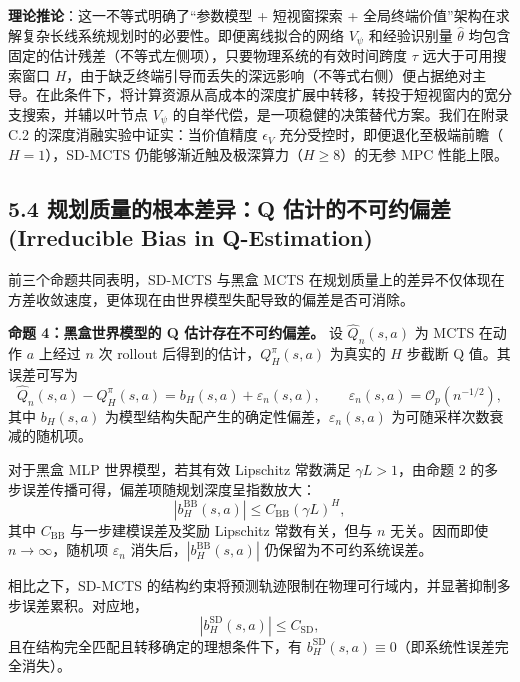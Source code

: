 \documentclass[UTF8]{ctexart}
\begin{document}
\textbf{理论推论}：这一不等式明确了``参数模型 + 短视窗探索 + 全局终端价值''架构在求解复杂长线系统规划时的必要性。即便离线拟合的网络 \(V_\psi\) 和经验识别量 \(\hat{\theta}\) 均包含固定的估计残差（不等式左侧项），只要物理系统的有效时间跨度 \(\tau\) 远大于可用搜索窗口 \(H\)，由于缺乏终端引导而丢失的深远影响（不等式右侧）便占据绝对主导。在此条件下，将计算资源从高成本的深度扩展中转移，转投于短视窗内的宽分支搜索，并辅以叶节点 $V_\psi$ 的自举代偿，是一项稳健的决策替代方案。我们在附录 C.2 的深度消融实验中证实：当价值精度 $\epsilon_V$ 充分受控时，即便退化至极端前瞻（$H=1$），SD-MCTS 仍能够渐近触及极深算力（$H \ge 8$）的无参 MPC 性能上限。

\hypertarget{ux89c4ux5212ux8d28ux91cfux7684ux6839ux672cux5deeux5f02q-ux4f30ux8ba1ux7684ux4e0dux53efux7ea6ux504fux5dee-irreducible-bias-in-q-estimation}{%
\subsection{5.4 规划质量的根本差异：Q 估计的不可约偏差 (Irreducible Bias
in
Q-Estimation)}\label{ux89c4ux5212ux8d28ux91cfux7684ux6839ux672cux5deeux5f02q-ux4f30ux8ba1ux7684ux4e0dux53efux7ea6ux504fux5dee-irreducible-bias-in-q-estimation}}

前三个命题共同表明，SD-MCTS 与黑盒 MCTS 在规划质量上的差异不仅体现在方差收敛速度，更体现在由世界模型失配导致的偏差是否可消除。

\textbf{命题 4：黑盒世界模型的 Q 估计存在不可约偏差。} 设 $\hat{Q}_{n}(s,a)$ 为 MCTS 在动作 $a$ 上经过 $n$ 次 rollout 后得到的估计，$Q_H^\pi(s,a)$ 为真实的 $H$ 步截断 Q 值。其误差可写为
\[
\hat{Q}_{n}(s,a)-Q_H^\pi(s,a)=b_H(s,a)+\varepsilon_n(s,a),\qquad \varepsilon_n(s,a)=\mathcal{O}_p(n^{-1/2}),
\]
其中 $b_H(s,a)$ 为模型结构失配产生的确定性偏差，$\varepsilon_n(s,a)$ 为可随采样次数衰减的随机项。

对于黑盒 MLP 世界模型，若其有效 Lipschitz 常数满足 $\gamma L>1$，由命题 2 的多步误差传播可得，偏差项随规划深度呈指数放大：
\[
\left|b_H^{\mathrm{BB}}(s,a)\right|\le C_{\mathrm{BB}}(\gamma L)^H,
\]
其中 $C_{\mathrm{BB}}$ 与一步建模误差及奖励 Lipschitz 常数有关，但与 $n$ 无关。因而即使 $n\to\infty$，随机项 $\varepsilon_n$ 消失后，$\left|b_H^{\mathrm{BB}}(s,a)\right|$ 仍保留为不可约系统误差。

相比之下，SD-MCTS 的结构约束将预测轨迹限制在物理可行域内，并显著抑制多步误差累积。对应地，
\[
\left|b_H^{\mathrm{SD}}(s,a)\right|\le C_{\mathrm{SD}},
\]
且在结构完全匹配且转移确定的理想条件下，有 $b_H^{\mathrm{SD}}(s,a)\equiv 0$（即系统性误差完全消失）。
\end{document}
